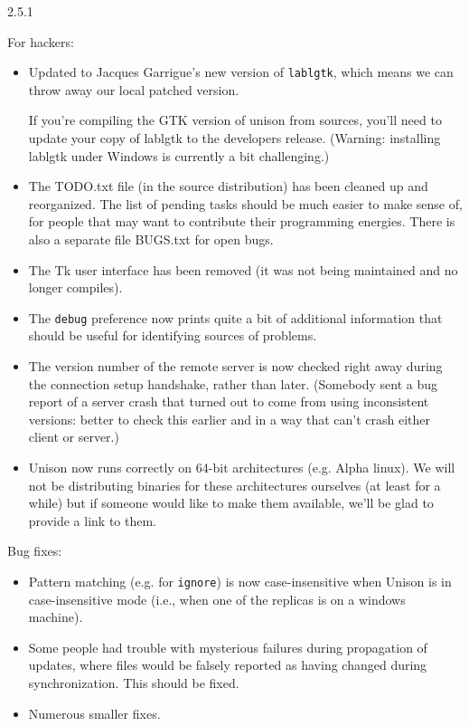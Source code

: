 \begin{changesfromversion}{2.5.1}
\item For hackers:
\begin{itemize}
\item Updated to Jacques Garrigue's new version of \verb|lablgtk|, which
  means we can throw away our local patched version.  

  If you're compiling the GTK version of unison from sources, you'll need
  to update your copy of lablgtk to the developers release.
  (Warning: installing lablgtk under Windows is currently a bit
  challenging.) 

\item The TODO.txt file (in the source distribution) has been cleaned up
and reorganized.  The list of pending tasks should be much easier to
make sense of, for people that may want to contribute their programming
energies.  There is also a separate file BUGS.txt for open bugs.
\item The Tk user interface has been removed (it was not being maintained
and no longer compiles).
\item The \verb|debug| preference now prints quite a bit of additional
information that should be useful for identifying sources of problems.
\item The version number of the remote server is now checked right away 
  during the connection setup handshake, rather than later.  (Somebody
  sent a bug report of a server crash that turned out to come from using
  inconsistent versions: better to check this earlier and in a way that
  can't crash either client or server.)
\item Unison now runs correctly on 64-bit architectures (e.g. Alpha
linux).  We will not be distributing binaries for these architectures
ourselves (at least for a while) but if someone would like to make them
available, we'll be glad to provide a link to them.
\end{itemize}

\item Bug fixes:
\begin{itemize}
\item Pattern matching (e.g. for \verb|ignore|) is now case-insensitive
  when Unison is in case-insensitive mode (i.e., when one of the replicas
  is on a windows machine).
\item Some people had trouble with mysterious failures during
  propagation of updates, where files would be falsely reported as having
  changed during synchronization.  This should be fixed.
\item Numerous smaller fixes.
\end{itemize}
\end{changesfromversion}

